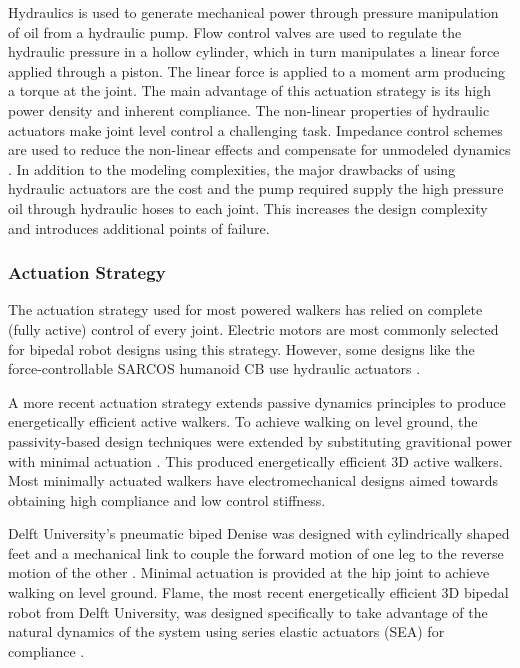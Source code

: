 Hydraulics is used to generate mechanical power through pressure manipulation of oil from a hydraulic pump. Flow control valves are used to regulate the hydraulic pressure in a hollow cylinder, which in turn manipulates a linear force applied through a piston. The linear force is applied to a moment arm producing a torque at the joint. The main advantage of this actuation strategy is its high power density and inherent compliance. The non-linear properties of hydraulic actuators make joint level control a challenging task. Impedance control schemes are used to reduce the non-linear effects and compensate for unmodeled dynamics \cite{Bilodeau1998}. In addition to the modeling complexities, the major drawbacks of using hydraulic actuators are the cost and the pump required supply the high pressure oil through hydraulic hoses to each joint. This increases the design complexity and introduces additional points of failure.

\subsubsection{Actuation Strategy} %
\label{ssub:actuation_strategy}
The actuation strategy used for most powered walkers has relied on complete (fully active) control of every joint. Electric motors are most commonly selected for bipedal robot designs using this strategy. However, some designs like the force-controllable SARCOS humanoid CB use hydraulic actuators \cite{SangHoHyon:2007jy}. 

A more recent actuation strategy extends passive dynamics principles to produce energetically efficient active walkers. To achieve walking on level ground, the passivity-based design techniques were extended by substituting gravitional power with minimal actuation \cite{Spong:1999vk,Collins:2005vp}. This produced energetically efficient 3D active walkers. Most minimally actuated walkers have electromechanical designs aimed towards obtaining high compliance and low control stiffness.

Delft University's pneumatic biped Denise was designed with cylindrically shaped feet and a mechanical link to couple the forward motion of one leg to the reverse motion of the other \cite{Anderson:2005cw}. Minimal actuation is provided at the hip joint to achieve walking on level ground. Flame, the most recent energetically efficient 3D bipedal robot from Delft University, was designed specifically to take advantage of the natural dynamics of the system \cite{Hobbelen2008} using series elastic actuators (SEA) for compliance \cite{Pratt1995}. 

